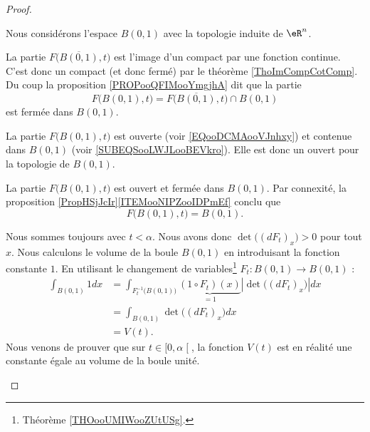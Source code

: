 \begin{proof}
\begin{subproof}
		Nous considérons l'espace \( B(0,1)\) avec la topologie induite de \( \eR^n\).
		\begin{subproof}

			La partie \( F\big( \overline{B(0,1)},t \big)\) est l'image d'un compact par une fonction continue. C'est donc un compact (et donc fermé) par le théorème \ref{ThoImCompCotComp}. Du coup la proposition \ref{PROPooQFIMooYmgjhA} dit que la partie
			\begin{equation}
				F\big( B(0,1), t \big)=  F\big( \overline{B(0,1)}, t \big)\cap B(0,1)
			\end{equation}
			est fermée dans \( B(0,1)\).


			La partie \( F\big( B(0,1), t \big)\) est ouverte (voir \eqref{EQooDCMAooVJnhxy}) et contenue dans \( B(0,1)\) (voir \eqref{SUBEQSooLWJLooBEVkro}). Elle est donc un ouvert pour la topologie de \( B(0,1)\).


			La partie \( F\big( B(0,1), t \big)\) est ouvert et fermée dans \( B(0,1)\). Par connexité, la proposition \ref{PropHSjJcIr}\ref{ITEMooNIPZooIDPmEf} conclu que
			\begin{equation}
				F\big( B(0,1),t \big)=B(0,1).
			\end{equation}
		\end{subproof}


		Nous sommes toujours avec \( t<\alpha\). Nous avons donc \( \det\big( (dF_t)_x \big)>0\) pour tout \( x\). Nous calculons le volume de la boule \( B(0,1)\) en introduisant la fonction constante \( 1\). En utilisant le changement de variables\footnote{Théorème \ref{THOooUMIWooZUtUSg}.} \(F_t \colon B(0,1) \to B(0,1)  \) :
		\begin{subequations}
			\begin{align}
				\int_{B(0,1)}1dx & =\int_{F_t^{-1}\big( B(0,1) \big)}\underbrace{(1\circ F_t)(x)}_{=1}| \det\big( (dF_t)_x \big) |dx \\
				                 & =\int_{B(0,1)}\det\big( (dF_t)_x \big)dx                                                          \\
				                 & =V(t).
			\end{align}
		\end{subequations}
		Nous venons de prouver que sur \( t\in \mathopen[ 0,\alpha\mathclose[\), la fonction \( V(t)\) est en réalité une constante égale au volume de la boule unité.


\end{subproof}
\end{proof}

